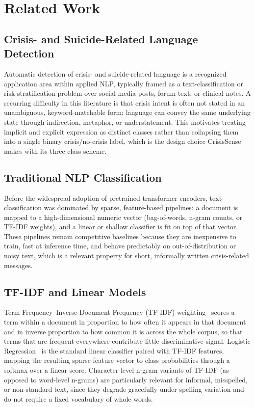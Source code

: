 \chapter{Related Work}

\section{Crisis- and Suicide-Related Language Detection}

Automatic detection of crisis- and suicide-related language is a recognized application area within applied NLP, typically framed as a text-classification or risk-stratification problem over social-media posts, forum text, or clinical notes. A recurring difficulty in this literature is that crisis intent is often not stated in an unambiguous, keyword-matchable form; language can convey the same underlying state through indirection, metaphor, or understatement. This motivates treating implicit and explicit expression as distinct classes rather than collapsing them into a single binary crisis/no-crisis label, which is the design choice CrisisSense makes with its three-class scheme.

\section{Traditional NLP Classification}

Before the widespread adoption of pretrained transformer encoders, text classification was dominated by sparse, feature-based pipelines: a document is mapped to a high-dimensional numeric vector (bag-of-words, n-gram counts, or TF-IDF weights), and a linear or shallow classifier is fit on top of that vector. These pipelines remain competitive baselines because they are inexpensive to train, fast at inference time, and behave predictably on out-of-distribution or noisy text, which is a relevant property for short, informally written crisis-related messages.

\section{TF-IDF and Linear Models}

Term Frequency--Inverse Document Frequency (TF-IDF) weighting~\cite{sparckjones1972statistical} scores a term within a document in proportion to how often it appears in that document and in inverse proportion to how common it is across the whole corpus, so that terms that are frequent everywhere contribute little discriminative signal. Logistic Regression~\cite{cox1958regression} is the standard linear classifier paired with TF-IDF features, mapping the resulting sparse feature vector to class probabilities through a softmax over a linear score. Character-level n-gram variants of TF-IDF (as opposed to word-level n-grams) are particularly relevant for informal, misspelled, or non-standard text, since they degrade gracefully under spelling variation and do not require a fixed vocabulary of whole words.

